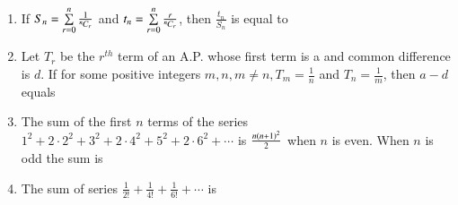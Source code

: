 \documentclass[journal,12pt,twocolumn]{IEEEtran}
\theoremstyle{remark}
\begin{document}
\begin{enumerate}[label={\arabic*.}]
\item {If $S_n = \sum\limits_{r=0}^{n} \frac{1}{{{}^{n}\mkern-1muC_{r}}}$ and $t_n = \sum\limits_{r=0}^{n} \frac{r}{{{}^{n}\mkern-1muC_{r}}}$, then $\frac{t_n}{S_n}$ is equal to}
{\hfill{}} 
\begin{enumerate}[label={\brak{\alph*}}]
\end{enumerate}

\item {Let $T_r$ be the $r^{th}$ term of an A.P. whose first term is a and common difference is $d$. If for some positive integers $m,n, m\neq n, T_m = \frac{1}{n}$ and $T_n = \frac{1}{m}$, then $a-d$ equals} 
{\hfill{}}
\begin{enumerate}[label={\brak{\alph*}}]
\end{enumerate}

\item {The sum of the first $n$ terms of the series $1^2+2\cdot2^2+3^2+2\cdot4^2+5^2+2\cdot6^2+\cdots$ is $\frac{n\left(n+1\right)^2}{2}$ when $n$ is even. When $n$ is odd the sum is}
{\hfill{}}
\begin{enumerate}[label={\brak{\alph*}}]
\end{enumerate}

\item {The sum of series $\frac{1}{2!}+\frac{1}{4!}+\frac{1}{6!}+\cdots$ is}
{\hfill{}} 
\begin{enumerate}[label={\brak{\alph*}}]
		\begin{multicols}{2}


\end{multicols}
\end{enumerate}
\end{enumerate}
\end{document}
